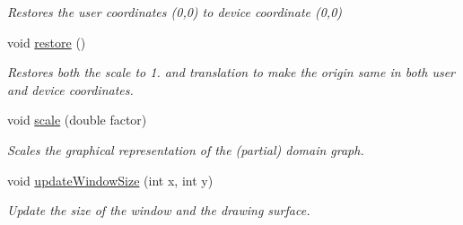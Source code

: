 \begin{DoxyCompactItemize}
\begin{DoxyCompactList}\small\item\em Restores the user coordinates (0,0) to device coordinate (0,0) \end{DoxyCompactList}\item 
void \hyperlink{structGraphics_a67e22daf21a367331c2b1cdb255ce59a}{restore} ()\hypertarget{structGraphics_a67e22daf21a367331c2b1cdb255ce59a}{}\label{structGraphics_a67e22daf21a367331c2b1cdb255ce59a}

\begin{DoxyCompactList}\small\item\em Restores both the scale to 1. and translation to make the origin same in both user and device coordinates. \end{DoxyCompactList}\item 
void \hyperlink{structGraphics_a9af634ab9bb4a6272cedf7aeb6fcb33f}{scale} (double factor)
\begin{DoxyCompactList}\small\item\em Scales the graphical representation of the (partial) domain graph. \end{DoxyCompactList}\item 
void \hyperlink{structGraphics_abe26afa57385b735253726b8e34143d9}{update\+Window\+Size} (int x, int y)
\begin{DoxyCompactList}\small\item\em Update the size of the window and the drawing surface. \end{DoxyCompactList}\end{DoxyCompactItemize}
